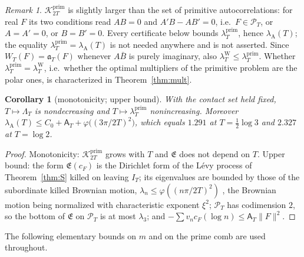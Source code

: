 \documentclass[11pt]{amsart}
\newtheorem{corollary}[theorem]{Corollary}
\theoremstyle{definition}
\theoremstyle{remark}
\newtheorem{remark}[theorem]{Remark}
\newcommand{\Kp}{\mathcal K^{\mathrm{prim}}_{2T}}
\newcommand{\PT}{\mathcal P_T}
\newcommand{\IT}{I_T}
\newcommand{\lamP}{\lambda^{\mathrm{prim}}_T}
\newcommand{\lamW}{\lambda^{\mathrm W}_T}
\newcommand{\lamA}{\lambda_{\mathrm A}(T)}
\newcommand{\cF}{c_F}
\newcommand{\Lev}{\mathfrak E}
\newcommand{\Aconst}{\mathsf A_T}
\begin{document}
\begin{remark}\label{rem:Kprim}
$\Kp$ is slightly larger than the set of primitive autocorrelations: for real $F$ its two
conditions read $AB=0$ and $A'B-AB'=0$, i.e.\ $F\in\PT$, or $A=A'=0$, or $B=B'=0$. Every
certificate below bounds $\lamP$, hence $\lamA$; the equality $\lamP=\lamA$ is not needed
anywhere and is not asserted. Since $W_T(F)=\mathfrak a_T(F)$ whenever $A\bar B$ is purely
imaginary, also $\lamW\le\lamP$. Whether $\lamP=\lamW$, i.e.\ whether the optimal multipliers of the
primitive problem are the polar ones, is characterized in Theorem~\ref{thm:mult}.
\end{remark}

\begin{corollary}[monotonicity; upper bound]\label{cor:mono}
With the contact set held fixed, $T\mapsto\Lambda_T$ is nondecreasing and $T\mapsto\lamP$
nonincreasing. Moreover
$\lamA\le C_0+\Aconst+\varphi\big((3\pi/2T)^2\big)$, which equals $1.291$ at $T=\frac12\log3$ and
$2.327$ at $T=\log 2$.
\end{corollary}
\begin{proof}
Monotonicity: $\Kp$ grows with $T$ and $\Lev$ does not depend on $T$. Upper bound: the form
$\Lev(\cF)$ is the Dirichlet form of the L\'evy process of Theorem~\ref{thm:S} killed on
leaving $\IT$; its eigenvalues are bounded by those of the subordinate killed Brownian motion,
$\lambda_n\le\varphi((n\pi/2T)^2)$ \cite[Prop.~2.3]{SongVondracek2003}, the Brownian motion being
normalized with characteristic exponent $\xi^2$; $\PT$ has codimension
$2$, so the bottom of $\Lev$ on $\PT$ is at most $\lambda_3$; and $-\sum v_n\cF(\log n)\le\Aconst\|F\|^2$.
\end{proof}

The following elementary bounds on $m$ and on the prime comb are used throughout.
\end{document}
